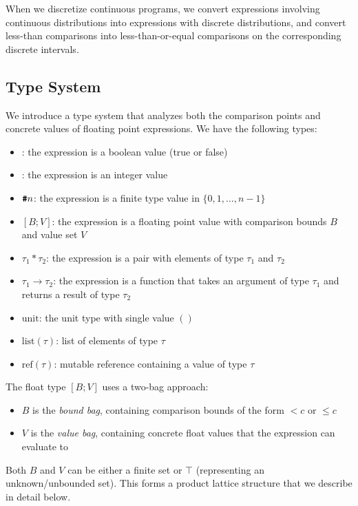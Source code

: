 When we discretize continuous programs, we convert expressions involving continuous distributions into expressions with discrete distributions, and convert less-than comparisons into less-than-or-equal comparisons on the corresponding discrete intervals.

\subsection{Type System}\label{sec:type-system}

We introduce a type system that analyzes both the comparison points and concrete values of floating point expressions. We have the following types:
\begin{itemize}
    \item \bool: the expression is a boolean value (true or false)
    \item \intty: the expression is an integer value  
    \item $\text{\ttfamily\bfseries \#}n$: the expression is a finite type value in $\{0, 1, \ldots, n-1\}$
    \item \float$[B; V]$: the expression is a floating point value with comparison bounds $B$ and value set $V$
    \item $\tau_1 * \tau_2$: the expression is a pair with elements of type $\tau_1$ and $\tau_2$
    \item $\tau_1 \rightarrow \tau_2$: the expression is a function that takes an argument of type $\tau_1$ and returns a result of type $\tau_2$
    \item $\text{unit}$: the unit type with single value $()$
    \item $\text{list}(\tau)$: list of elements of type $\tau$
    \item $\text{ref}(\tau)$: mutable reference containing a value of type $\tau$
\end{itemize}

The float type \float$[B; V]$ uses a two-bag approach:
\begin{itemize}
    \item $B$ is the \emph{bound bag}, containing comparison bounds of the form $< c$ or $\leq c$
    \item $V$ is the \emph{value bag}, containing concrete float values that the expression can evaluate to
\end{itemize}

Both $B$ and $V$ can be either a finite set or $\top$ (representing an unknown/unbounded set). This forms a product lattice structure that we describe in detail below.

